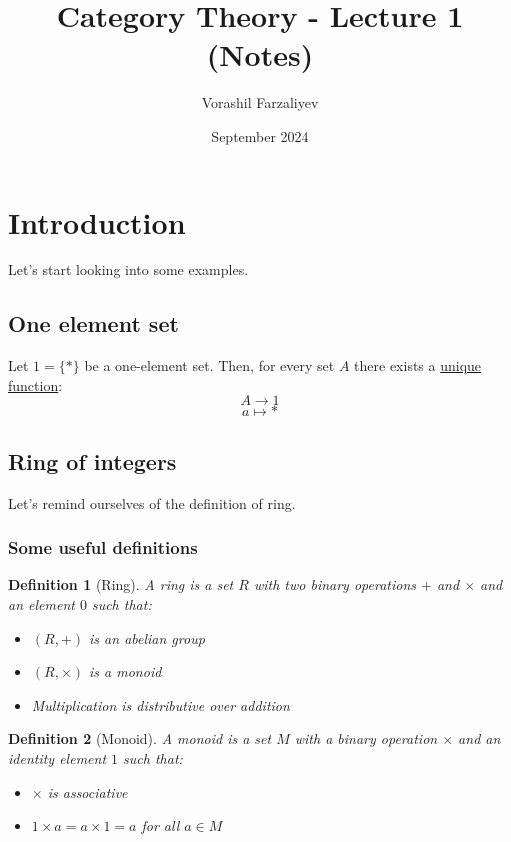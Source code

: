 \documentclass{article}
\title{Category Theory - Lecture 1 (Notes)}
\author{Vorashil Farzaliyev}
\date{September 2024}
\newtheorem{definition}{Definition}
\begin{document}
    \maketitle


    \section{Introduction}

    Let's start looking into some examples.

    \subsection{One element set}

    Let $1 = \{*\}$ be a one-element set. Then, for every set $A$ there exists a
    \underline{unique function}:
    \[
        A \to 1
    \]
    \[
        a \mapsto *
    \]

    \subsection{Ring of integers}
    Let's remind ourselves of the definition of ring.

    \subsubsection{Some useful definitions}

    \begin{definition}[Ring]
        A ring is a set $R$ with two binary operations $+$ and $\times$ and an element $0$ such that:
        \begin{itemize}
            \item $(R, +)$ is an abelian group
            \item $(R, \times)$ is a monoid
            \item Multiplication is distributive over addition
        \end{itemize}
    \end{definition}

    \begin{definition}[Monoid]
        A monoid is a set $M$ with a binary operation $\times$ and an identity element $1$ such that:
        \begin{itemize}
            \item $\times$ is associative
            \item $1 \times a = a \times 1 = a$ for all $a \in M$
        \end{itemize}
    \end{definition}
\end{document}
